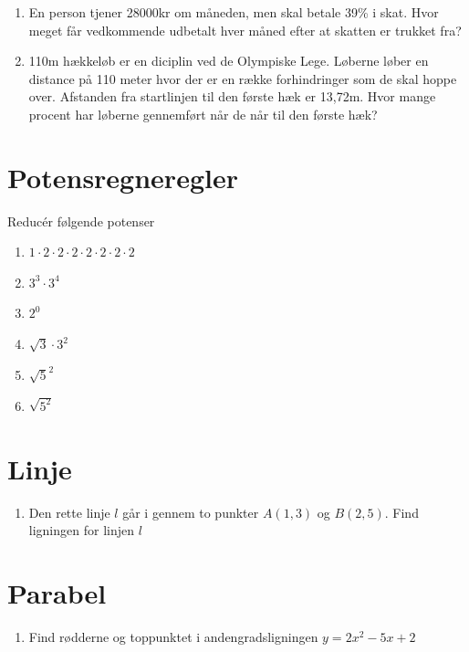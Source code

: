 \documentclass[11pt,a5paper,fleqn,leqno]{book}
\begin{document}
\begin{enumerate}
\item \label{op:procent_1} En person tjener 28000kr om måneden, men skal betale 39\% i skat. Hvor meget får vedkommende udbetalt hver måned efter at skatten er trukket fra?
\item \label{op:procent_2} 110m hækkeløb er en diciplin ved de Olympiske Lege. Løberne løber en distance på 110 meter hvor der er en række forhindringer som de skal hoppe over. Afstanden fra startlinjen til den første hæk er 13,72m. Hvor mange procent har løberne gennemført når de når til den første hæk?
\end{enumerate}

\section{Potensregneregler}

Reducér følgende potenser

\begin{enumerate}
\item \label{op:potens_1} $1 \cdot 2 \cdot 2 \cdot 2 \cdot 2 \cdot 2 \cdot 2 \cdot 2$
\item \label{op:potens_2} $3^3 \cdot 3^4$
\item \label{op:potens_3} $2^0$
\item \label{op:potens_4} $\sqrt{3} \cdot 3^2$
\item \label{op:potens_5} $\sqrt{5}^2$
\item \label{op:potens_6} $\sqrt{5^2}$
\end{enumerate}

\section{Linje}

\begin{enumerate}
\item \label{op:linje_1} Den rette linje $l$ går i gennem to punkter $A(1,3)$ og $B(2,5)$. Find ligningen for linjen $l$
\end{enumerate}

\section{Parabel}

\begin{enumerate}
\item \label{op:parabel_1} Find rødderne og toppunktet i andengradsligningen $y = 2x^2 - 5x + 2$
\end{enumerate}
\end{document}
